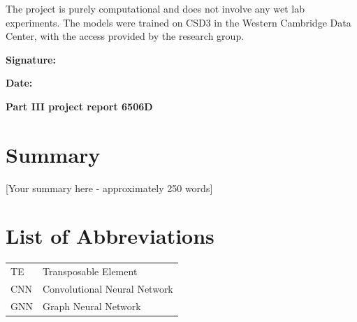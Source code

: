 \documentclass[12pt]{article}
\begin{document}
\vspace{1.5cm}

\noindent The project is purely computational and does not involve any wet lab experiments. The models were trained on CSD3 in the Western Cambridge Data Center, with the access provided by the research group. 

\vspace{2cm}

\noindent\textbf{Signature:} \hrulefill

\vspace{1cm}

\noindent\textbf{Date:} \hrulefill

\newpage
\thispagestyle{empty}

\vspace*{\fill}
\begin{center}
    {\fontsize{24.88}{34}\selectfont\bfseries Part III project report 6506D\par}
\end{center}
\vspace*{\fill}

\newpage
\section*{Summary}

[Your summary here - approximately 250 words]

\newpage
\tableofcontents

\newpage
\section*{List of Abbreviations}

\begin{tabular}{ll}
    TE & Transposable Element \\
    CNN & Convolutional Neural Network \\
    GNN & Graph Neural Network \\
\end{tabular}

\iffalse

\end{document}
